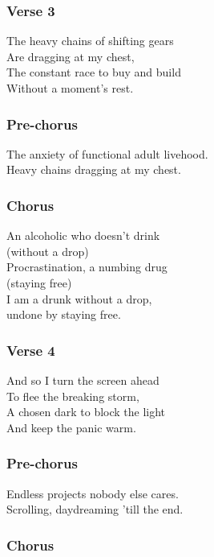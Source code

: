 \documentclass[]{article}
\begin{document}
\subsubsection{Verse 3}\label{verse-3-3}

The heavy chains of shifting gears\\
Are dragging at my chest,\\
The constant race to buy and build\\
Without a moment's rest.

\subsubsection{Pre-chorus}\label{pre-chorus-5}

The anxiety of functional adult livehood.\\
Heavy chains dragging at my chest.

\subsubsection{Chorus}\label{chorus-12}

An alcoholic who doesn't drink\\
(without a drop)\\
Procrastination, a numbing drug\\
(staying free)\\
I am a drunk without a drop,\\
undone by staying free.

\subsubsection{Verse 4}\label{verse-4-3}

And so I turn the screen ahead\\
To flee the breaking storm,\\
A chosen dark to block the light\\
And keep the panic warm.

\subsubsection{Pre-chorus}\label{pre-chorus-6}

Endless projects nobody else cares.\\
Scrolling, daydreaming 'till the end.

\subsubsection{Chorus}\label{chorus-13}
\end{document}
